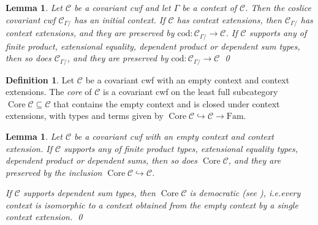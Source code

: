 \documentclass[a4paper]{article}
\newtheorem{lemma}[theorem]{Lemma}
\theoremstyle{remark}
\theoremstyle{definition}
\newtheorem{definition}[theorem]{Definition}
\begin{document}
\begin{lemma}
  \label{lem:coslice-cwf}
  Let $\mathcal{C}$ be a covariant cwf and let $\Gamma$ be a context of $\mathcal{C}$.
  Then the coslice covariant cwf $\mathcal{C}_{\Gamma /}$ has an initial context.
  If $\mathcal{C}$ has context extensions, then $\mathcal{C}_{\Gamma /}$ has context extensions, and they are preserved by $\mathrm{cod} : \mathcal{C}_{\Gamma /} \rightarrow \mathcal{C}$.
  If $\mathcal{C}$ supports any of finite product, extensional equality, dependent product or dependent sum types, then so does $\mathcal{C}_{\Gamma /}$, and they are preserved by $\mathrm{cod} : \mathcal{C}_{\Gamma /} \rightarrow \mathcal{C}$
  \qed
\end{lemma}

\begin{definition}
  Let $\mathcal{C}$ be a covariant cwf with an empty context and context extensions.
  The \emph{core} of $\mathcal{C}$ is a covariant cwf on the least full subcategory $\operatorname{Core} \mathcal{C} \subseteq \mathcal{C}$ that contains the empty context and is closed under context extensions, with types and terms given by $\operatorname{Core} \mathcal{C} \hookrightarrow \mathcal{C} \rightarrow \mathrm{Fam}$.
\end{definition}

\begin{lemma}
  \label{lem:core-cwf}
  Let $\mathcal{C}$ be a covariant cwf with an empty context and context extension.
  If $\mathcal{C}$ supports any of finite product types, extensional equality types, dependent product or dependent sums, then so does $\operatorname{Core} \mathcal{C}$, and they are preserved by the inclusion $\operatorname{Core} \mathcal{C} \hookrightarrow \mathcal{C}$.

  If $\mathcal{C}$ supports dependent sum types, then $\operatorname{Core} \mathcal{C}$ is democratic (see \cite{biequivalence-lcc-cwf}), i.e.\@ every context is isomorphic to a context obtained from the empty context by a single context extension.
  \qed
\end{lemma}
\end{document}
